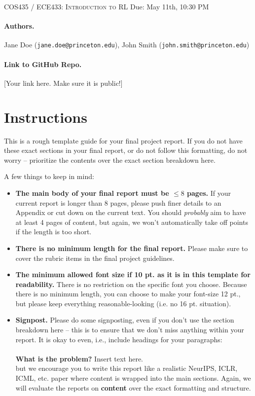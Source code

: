 \documentclass{article}
\begin{document}
\newcommand{\lectureTitle}{YOUR TITLE HERE}
\newcommand{\lectureDate}{Due: May 11th, 10:30 PM}

\textsc{COS435 / ECE433: Introduction to RL}
\vspace{1em} \hfill \lectureDate

\maketitle

\paragraph{Authors.} Jane Doe (\texttt{jane.doe@princeton.edu}), John Smith (\texttt{john.smith@princeton.edu})

\paragraph{Link to GitHub Repo.} [Your link here. Make sure it is public!]
\section*{Instructions}

This is a rough template guide for your final project report. If you do not have these exact sections in your final report, or do not follow this formatting, do not worry -- prioritize the contents over the exact section breakdown here.

A few things to keep in mind:
\begin{itemize}
    \item {\bf The main body of your final report must be $\leq 8$ pages.} If your current report is longer than $8$ pages, please push finer details to an Appendix or cut down on the current text. You should {\it probably} aim to have at least 4 pages of content, but again, we won't automatically take off points if the length is too short.
    \item {\bf There is no minimum length for the final report.} Please make sure to cover the rubric items in the final project guidelines.
    \item {\bf The minimum allowed font size if 10 pt. as it is in this template for readability.} There is no restriction on the specific font you choose. Because there is no minimum length, you can choose to make your font-size 12 pt., but please keep everything reasonable-looking (i.e. no 16 pt. situation).
    \item {\bf Signpost.} Please do some signposting, even if you don't use the section breakdown here -- this is to ensure that we don't miss anything within your report. It is okay to even, i.e., include headings for your paragraphs:
    \\\\{\bf What is the problem? } Insert text here. \\

    but we encourage you to write this report like a realistic NeurIPS, ICLR, ICML, etc. paper where content is wrapped into the main sections. Again, we will evaluate the reports on {\bf content} over the exact formatting and structure.
\end{itemize}
\end{document}
